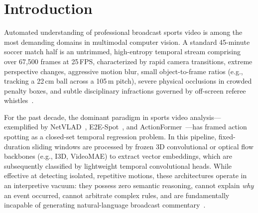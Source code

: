 \documentclass[10pt,twocolumn,letterpaper]{article}
\begin{document}
\begin{abstract}
We also release harnesses for ten further SoccerNet task families (Tracks C--L) and an athlete-valuation demonstrator (ReVal). These are small single-half studies: Tracks D, E, F, G, H, and K use scripted predictions or self-derived references and are reported as illustrations, not as model measurements.
All code, dataset splits, and reproducible evaluation harnesses are released under an open-source license.
\end{abstract}

\section{Introduction}
\label{sec:intro}

Automated understanding of professional broadcast sports video is among the most demanding domains in multimodal computer vision. A standard 45-minute soccer match half is an untrimmed, high-entropy temporal stream comprising over 67,500 frames at 25\,FPS, characterized by rapid camera transitions, extreme perspective changes, aggressive motion blur, small object-to-frame ratios (e.g., tracking a 22\,cm ball across a 105\,m pitch), severe physical occlusions in crowded penalty boxes, and subtle disciplinary infractions governed by off-screen referee whistles~\cite{giancola2018soccernet,deliege2021soccernetv2}.

For the past decade, the dominant paradigm in sports video analysis—exemplified by NetVLAD~\cite{arandjelovic2016netvlad}, E2E-Spot~\cite{hong2022e2espot}, and ActionFormer~\cite{zhang2022actionformer}—has framed action spotting as a closed-set temporal regression problem. In this pipeline, fixed-duration sliding windows are processed by frozen 3D convolutional or optical flow backbones (e.g., I3D, VideoMAE) to extract vector embeddings, which are subsequently classified by lightweight temporal convolutional heads. While effective at detecting isolated, repetitive motions, these architectures operate in an interpretive vacuum: they possess zero semantic reasoning, cannot explain \textit{why} an event occurred, cannot arbitrate complex rules, and are fundamentally incapable of generating natural-language broadcast commentary~\cite{cioppa2022soccernetcaption}.
\end{document}
